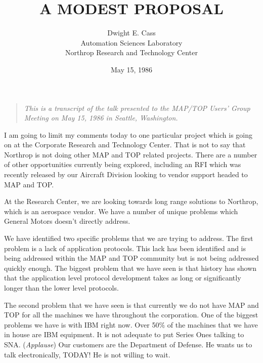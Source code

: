 



\title{A MODEST PROPOSAL}
\author{Dwight E. Cass\\
        Automation Sciences Laboratory\\
        Northrop Research and Technology Center}
\date{May 15, 1986}
\maketitle

\begin{quote}\em
This is a transcript of the talk presented to the MAP/TOP Users' Group Meeting
on May 15, 1986 in Seattle, Washington.
\end{quote}

\bigskip

I am going to limit my comments today to one particular project which is
going on at the Corporate Research and Technology Center.  That is not to
say that Northrop is not doing other MAP and TOP related projects.  There
are a number of other opportunities currently being explored, including
an RFI which was recently released by our Aircraft Division looking to
vendor support headed to MAP and TOP.

At the Research Center, we are looking towards long range solutions to
Northrop, which is an aerospace vendor.  We have a number of unique problems
which General Motors doesn't directly address.

We have identified two specific problems that we are trying to address.  The
first problem is a lack of application protocols.  This lack has been
identified and is being addressed within the MAP and TOP community but is
not being addressed quickly enough.  The biggest problem that we have seen
is that history has shown that the application level protocol development
takes as long or significantly longer than the lower level protocols.

The second problem that we have seen is that currently we do not have MAP
and TOP for all the machines we have throughout the corporation.  One of
the biggest problems we have is with IBM right now.  Over 50\% of the
machines that we have in house are IBM equipment.  It is not adequate
to put Series Ones talking to SNA.  ({\em Applause\/})  Our customers
are the Department of Defense.  He wants us to talk electronically, TODAY!
He is not willing to wait.

